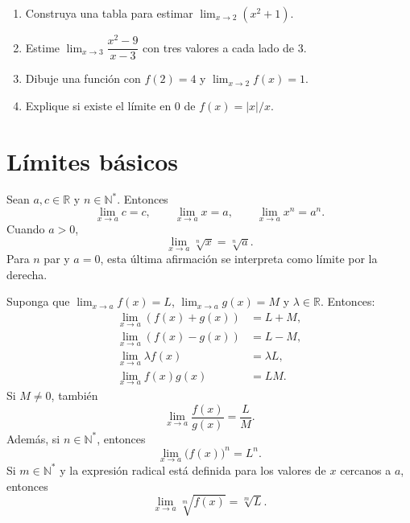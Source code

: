 \documentclass[10pt,a5paper]{article}
\newif\ifmostrarSoluciones
\begin{document}
\begin{ejercicios}
\begin{enumerate}
  \item Construya una tabla para estimar $\lim_{x\to2}(x^2+1)$.
  \item Estime $\lim_{x\to3}\dfrac{x^2-9}{x-3}$ con tres valores a cada lado de $3$.
  \item Dibuje una función con $f(2)=4$ y $\lim_{x\to2}f(x)=1$.
  \item Explique si existe el límite en $0$ de $f(x)=|x|/x$.
\end{enumerate}
\end{ejercicios}

\ifmostrarSoluciones
\begin{solucion}[de los ejercicios]
\begin{enumerate}
  \item Los valores se aproximan a $5$.
  \item Para $x\neq3$, el cociente es $x+3$; la tabla se aproxima a $6$.
  \item Por ejemplo, $f(x)=1$ si $x\neq2$ y $f(2)=4$.
  \item No existe: los límites laterales son $-1$ y $1$.
\end{enumerate}
\end{solucion}
\fi
\section*{Límites básicos}

\begin{proposicion}
Sean $a,c\in\mathbb{R}$ y $n\in\mathbb{N}^{*}$. Entonces
\[
\lim_{x\to a}c=c,\qquad
\lim_{x\to a}x=a,\qquad
\lim_{x\to a}x^n=a^n.
\]
Cuando $a>0$,
\[
\lim_{x\to a}\sqrt[n]{x}=\sqrt[n]{a}.
\]
Para $n$ par y $a=0$, esta última afirmación se interpreta como límite por la derecha.
\end{proposicion}

\begin{teorema}
Suponga que $\lim_{x\to a}f(x)=L$, $\lim_{x\to a}g(x)=M$ y $\lambda\in\mathbb{R}$. Entonces:
\begin{align*}
\lim_{x\to a}(f(x)+g(x))&=L+M,\\
\lim_{x\to a}(f(x)-g(x))&=L-M,\\
\lim_{x\to a}\lambda f(x)&=\lambda L,\\
\lim_{x\to a}f(x)g(x)&=LM.
\end{align*}
Si $M\neq0$, también
\[
\lim_{x\to a}\frac{f(x)}{g(x)}=\frac{L}{M}.
\]
Además, si $n\in\mathbb{N}^{*}$, entonces
\[
\lim_{x\to a}\bigl(f(x)\bigr)^n=L^n.
\]
Si $m\in\mathbb{N}^{*}$ y la expresión radical está definida para los valores de $x$ cercanos a $a$, entonces
\[
\lim_{x\to a}\sqrt[m]{f(x)}=\sqrt[m]{L}.
\]
\end{teorema}
\end{document}
